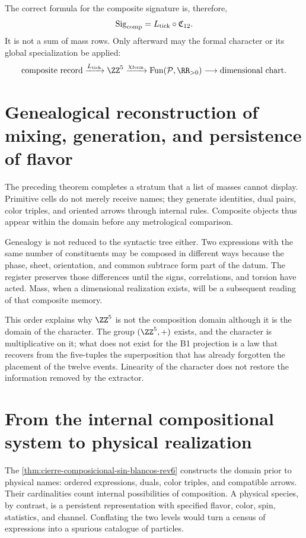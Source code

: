 The correct formula for the composite signature is, therefore,
\[
 \operatorname{Sig}_{\rm comp}
 =
 L_{\rm tick}\circ\mathfrak C_{12}.
\]
It is not a sum of mass rows. Only afterward may the formal character
or its global specialization be applied:
\[
 \text{composite record}
 \xrightarrow{L_{\rm tick}}\ZZ^5
 \xrightarrow{\chi_{\rm form}}\operatorname{Fun}(\mathcal P,\RR_{>0})
 \longrightarrow
 \text{dimensional chart}.
\]

\section{Genealogical reconstruction of mixing, generation, and persistence of flavor}
\label{sec:significado-genealogico-composicion-rev6}

The preceding theorem completes a stratum that a list of masses cannot
display. Primitive cells do not merely receive names; they generate
identities, dual pairs, color triples, and oriented arrows through
internal rules. Composite objects thus appear within the domain before
any metrological comparison.

Genealogy is not reduced to the syntactic tree either. Two expressions with the
same number of constituents may be composed in different ways because
the phase, sheet, orientation, and common subtrace form part of the datum.
The register preserves those differences until the signs,
correlations, and torsion have acted. Mass, when a dimensional
realization exists, will be a subsequent reading of that composite memory.

This order explains why \(\ZZ^5\) is not the composition domain although
it is the domain of the character. The group \((\ZZ^5,+)\) exists, and the character is
multiplicative on it; what does not exist for the B1 projection is a law
that recovers from the five-tuples the superposition that has already forgotten
the placement of the twelve events. Linearity of the character does not restore the
information removed by the extractor.

\section{From the internal compositional system to physical realization}
\label{sec:delimitacion-composicion-especies-rev6}

The \cref{thm:cierre-composicional-sin-blancos-rev6} constructs the domain
prior to physical names: ordered expressions, duals, color triples, and
compatible arrows. Their cardinalities count internal possibilities of
composition. A physical species, by contrast, is a persistent representation
with specified flavor, color, spin, statistics, and channel. Conflating the two
levels would turn a census of expressions into a spurious catalogue of
particles.

